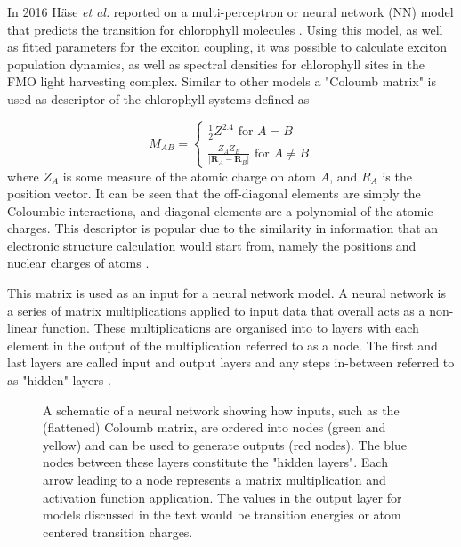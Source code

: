 In 2016 H\"{a}se \emph{et al.} reported on a multi-perceptron or neural network (NN)
model that predicts the \Qy transition for chlorophyll molecules \cite{AspuruGuzik2016}.
Using this model, as well as fitted parameters for the exciton coupling, it was 
possible to calculate exciton population dynamics, as well as spectral densities
for chlorophyll sites in the FMO light harvesting complex. Similar to other models
a "Coloumb matrix" \cite{Rupp2012a, Montavon2013} is used as descriptor of the chlorophyll
systems defined as 

\begin{equation}
	M_{AB} = 
	  \begin{cases}
		\frac{1}{2} Z^{2.4} \text{ for } A = B\\
		\frac{Z_A Z_B}{\left\lvert \mathbf{R}_A - \mathbf{R}_B\right\rvert} \text{ for } A \neq B
	  \end{cases}
\end{equation}
%
where $Z_A$ is some measure of the atomic charge on atom $A$, and $R_A$ is the position
vector. It can be seen that the off-diagonal elements are simply the Coloumbic interactions,
and diagonal elements are a polynomial of the atomic charges. This descriptor is
popular due to the similarity in information that an electronic structure calculation
would start from, namely the positions and nuclear charges of atoms \cite{Raghunathan2022}.

This matrix is used as an input for a neural network model. A neural network is 
a series of matrix multiplications applied to input data that overall acts as a
non-linear function. These multiplications are organised into to layers with each 
element in the output of the multiplication referred to as a node. The first and
last layers are called  input and output layers and any steps in-between referred
to as "hidden" layers \cite{Rumelhart1986}.

\begin{figure}
	\centering
	\begin{neuralnetwork}[height=4]
        \hiddenlayer[count=4, bias=false, title=Hidden\\layer 1] \linklayers
        \hiddenlayer[count=3, bias=false, title=Hidden\\layer 2] \linklayers
        \outputlayer[count=2, title=Output\\layer] \linklayers
	\end{neuralnetwork}
	\caption{A schematic of a neural network showing how inputs, such as the
	(flattened) Coloumb matrix, are ordered into nodes (green and yellow) and can
	be used to generate outputs (red nodes). The blue nodes between these layers
	constitute the "hidden layers". Each arrow leading to a node represents a matrix
	multiplication and activation function application. The values in the output
	layer for models discussed in the text would be \Qy transition energies or atom
	centered transition charges.}
	\label{fig:neural_network}
\end{figure}

